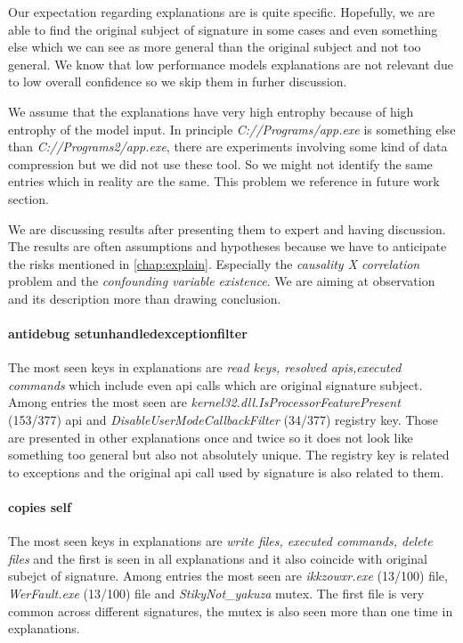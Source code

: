 Our expectation regarding explanations are is quite specific. Hopefully, we are able to find the original subject of signature in some cases and even something else which we can see as more general than the original subject and not too general. We know that low performance models explanations are not relevant due to low overall confidence so we skip them in furher discussion.

We assume that the explanations have very high entrophy because of high entrophy of the model input. In principle \emph{C://Programs/app.exe} is something else than \emph{C://Programs2/app.exe}, there are experiments involving some kind of data compression but we did not use these tool. So we might not identify the same entries which in reality are the same. This problem we reference in future work section.

We are discussing results after presenting them to expert and having discussion. The results are often assumptions and hypotheses because we have to anticipate the risks mentioned in \ref{chap:explain}. Especially the \emph{causality X correlation} problem and the \emph{confounding variable existence}. We are aiming at observation and its description more than drawing conclusion.


\paragraph{antidebug setunhandledexceptionfilter}
The most seen keys in explanations are \emph{read keys, resolved apis,executed commands} which include even api calls which are original signature subject. Among entries the most seen are \emph{kernel32.dll.IsProcessorFeaturePresent} (153/377) api and \emph{DisableUserModeCallbackFilter} (34/377) registry key. Those are presented in other explanations once and twice so it does not look like something too general but also not absolutely unique. The registry key is related to exceptions and the original api call used by signature is also related to them.

\paragraph{copies self}
The most seen keys in explanations are \emph{write files, executed commands, delete files} and the first is seen in all explanations and it also coincide with original subejct of signature. Among entries the most seen are \emph{ikkzowxr.exe} (13/100) file, \emph{WerFault.exe} (13/100) file and \emph{StikyNot_yakuza} mutex. The first file is very common across different signatures, the mutex is also seen more than one time in explanations.

